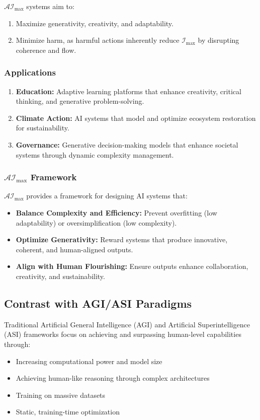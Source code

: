 \documentclass[12pt]{article}
\begin{document}
\( \mathcal{AI}_{\text{max}} \) systems aim to:
\begin{enumerate}
    \item Maximize generativity, creativity, and adaptability.
    \item Minimize harm, as harmful actions inherently reduce \( \mathcal{I}_{\text{max}} \) by disrupting coherence and flow.
\end{enumerate}

\subsubsection{Applications}
\begin{enumerate}
    \item \textbf{Education:} Adaptive learning platforms that enhance creativity, critical thinking, and generative problem-solving.
    \item \textbf{Climate Action:} AI systems that model and optimize ecosystem restoration for sustainability.
    \item \textbf{Governance:} Generative decision-making models that enhance societal systems through dynamic complexity management.
\end{enumerate}

\subsubsection{\( \mathcal{AI}_{\text{max}} \) Framework}
\( \mathcal{AI}_{\text{max}} \) provides a framework for designing AI systems that:
\begin{itemize}
    \item \textbf{Balance Complexity and Efficiency:} Prevent overfitting (low adaptability) or oversimplification (low complexity).
    \item \textbf{Optimize Generativity:} Reward systems that produce innovative, coherent, and human-aligned outputs.
    \item \textbf{Align with Human Flourishing:} Ensure outputs enhance collaboration, creativity, and sustainability.
\end{itemize}

\subsection{Contrast with AGI/ASI Paradigms}

Traditional Artificial General Intelligence (AGI) and Artificial Superintelligence (ASI) frameworks focus on achieving and surpassing human-level capabilities through:
\begin{itemize}
    \item Increasing computational power and model size
    \item Achieving human-like reasoning through complex architectures
    \item Training on massive datasets
    \item Static, training-time optimization
\end{itemize}
\end{document}
